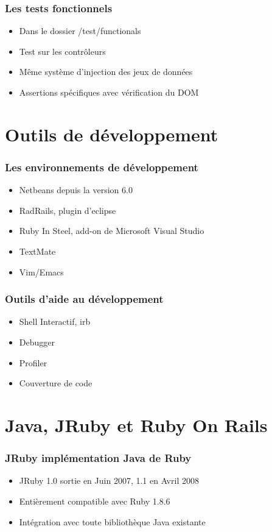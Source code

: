 \documentclass{beamer}
\begin{document}
\begin{frame}
    \frametitle{Les tests fonctionnels}
    \begin{itemize}
        \item Dans le dossier /test/functionals
        \item Test sur les contr\^oleurs
        \item Même système d'injection des jeux de données
        \item Assertions spécifiques avec vérification du DOM
    \end{itemize}
\end{frame}

\section{Outils de développement}

\begin{frame}
    \frametitle{Les environnements de développement}
    \begin{itemize}
        \item Netbeans depuis la version 6.0 
        \item RadRails, plugin d'eclipse
        \item Ruby In Steel, add-on de Microsoft Visual Studio
        \item TextMate
        \item Vim/Emacs
    \end{itemize}
\end{frame}

\begin{frame}
    \frametitle{Outils d'aide au développement}
    \begin{itemize}
        \item Shell Interactif, irb
        \item Debugger
        \item Profiler
        \item Couverture de code
    \end{itemize}
\end{frame}

\section{Java, JRuby et Ruby On Rails}

\begin{frame}
    \frametitle{JRuby implémentation Java de Ruby}
    \begin{itemize}
        \item JRuby 1.0 sortie en Juin 2007, 1.1 en Avril 2008
        \item Entièrement compatible avec Ruby 1.8.6
        \item Intégration avec toute bibliothèque Java existante
    \end{itemize}
\end{frame}
\end{document}
